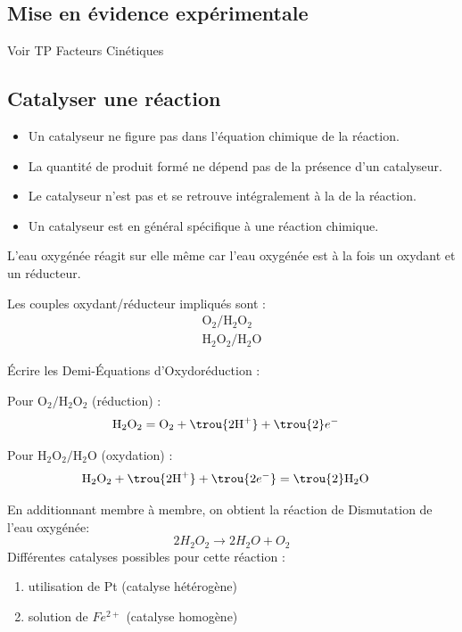 \subsection{Mise en évidence expérimentale}
Voir TP Facteurs Cinétiques


\subsection{Catalyser une réaction}

\begin{itemize}
	\item Un catalyseur ne figure pas dans l'équation chimique de la réaction.
	\item La quantité de produit formé ne dépend pas de la présence d'un catalyseur.
	\item Le catalyseur n'est pas  et se retrouve intégralement à la  de la réaction.
	\item Un catalyseur est en général spécifique à une réaction chimique.
\end{itemize}

L'eau oxygénée réagit sur elle même car l'eau oxygénée est à la fois un oxydant et un réducteur. 

Les couples oxydant/réducteur impliqués sont :
\begin{align*}
    \text{O}_2 / \text{H}_2\text{O}_2 \\
    \text{H}_2\text{O}_2 / \text{H}_2\text{O}
\end{align*}

Écrire les Demi-Équations d'Oxydoréduction :

Pour \(\text{O}_2 / \text{H}_2\text{O}_2\) (réduction) :
\begin{align*}
   \text{H}_2\text{O}_2 &=  \text{O}_2 + \trou{2\text{H}^+} + \trou{2}e^-
\end{align*}

Pour \(\text{H}_2\text{O}_2 / \text{H}_2\text{O}\) (oxydation) :
\begin{align*}
    \text{H}_2\text{O}_2 +\trou{ 2\text{H}^+} +\trou{ 2e^-} &= \trou{2}\text{H}_2\text{O} 
\end{align*}

En additionnant membre à membre, on obtient la réaction de Dismutation de l'eau oxygénée: $$2H_2O_2 \longrightarrow 2H_2O + O_2 $$
Différentes catalyses possibles pour cette réaction :
\begin{enumerate}
	\item utilisation de Pt (catalyse hétérogène)
	\item solution de $Fe^{2+}$ (catalyse homogène)
\end{enumerate}


